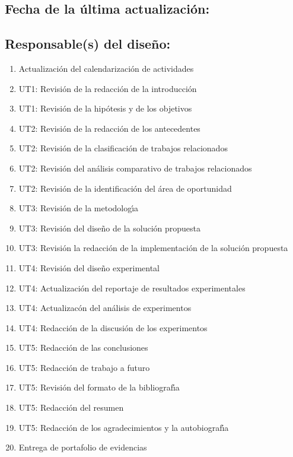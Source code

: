 \documentclass[10 pt]{article}
\begin{document}
\subsection{Fecha de la \'{u}ltima actualizaci\'{o}n:} 
\subsection{Responsable(s) del dise\~{n}o:}
\fbox{\parbox{9cm}{\begin{itemize}[label={}]
\item {\nroger~\roger}
\item {\nelisa~\elisa}
\end{itemize}}}
\newpage



\begin{enumerate}[itemsep=-2pt]
\item Actualizaci\'{o}n del calendarizaci\'{o}n de actividades
\item UT1: Revisi\'{o}n de la redacci\'{o}n de la introducci\'{o}n
\item UT1: Revisi\'{o}n de la hip\'{o}tesis y de los objetivos
\item UT2: Revisi\'{o}n de la redacci\'{o}n de los antecedentes
\item UT2: Revisi\'{o}n de la clasificaci\'{o}n de trabajos relacionados
\item UT2: Revisi\'{o}n del an\'{a}lisis comparativo de trabajos relacionados
\item UT2: Revisi\'{o}n de la identificaci\'{o}n del \'{a}rea de oportunidad
\item UT3: Revisi\'{o}n de la metodolog\'{\i}a
\item UT3: Revisi\'{o}n del dise\~{n}o de la soluci\'{o}n propuesta
\item UT3: Revisi\'{o}n la redacci\'{o}n de la implementaci\'{o}n de la soluci\'{o}n propuesta
\item UT4: Revisi\'{o}n del dise\~{n}o experimental
\item UT4: Actualizaci\'{o}n del reportaje de resultados experimentales
\item UT4: Actualizac\'{o}n del an\'{a}lisis de experimentos
\item UT4: Redacci\'{o}n de la discusi\'{o}n de los experimentos
\item UT5: Redacci\'{o}n de las conclusiones
\item UT5: Redacci\'{o}n de trabajo a futuro
\item UT5: Revisi\'{o}n del formato de la bibliograf\'{\i}a
\item UT5: Redacci\'{o}n del resumen
\item UT5: Redacci\'{o}n de los agradecimientos y la autobiograf\'{\i}a
\item Entrega de portafolio de evidencias
\end{enumerate}
\end{document}
